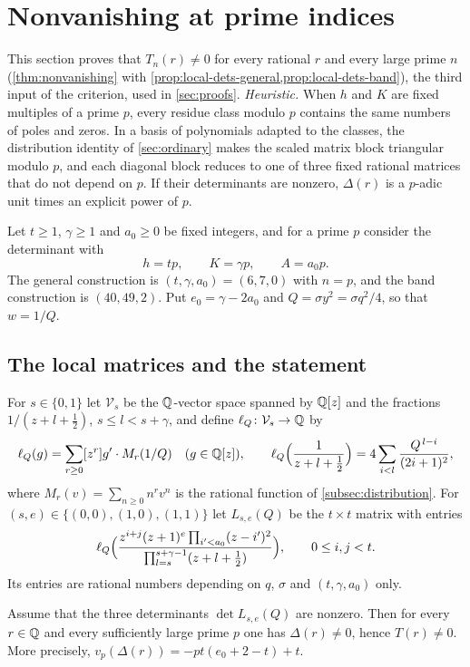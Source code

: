 \section{Nonvanishing at prime indices}\label{sec:nonvanishing}

This section proves that $T_n(r)\ne0$ for every rational $r$ and every large prime $n$
(\cref{thm:nonvanishing} with \cref{prop:local-dets-general,prop:local-dets-band}), the third input
of the criterion, used in \cref{sec:proofs}. \emph{Heuristic.} When $h$ and $K$ are fixed multiples
of a prime $p$, every residue class modulo $p$ contains the same numbers of poles and zeros. In a
basis of polynomials adapted to the classes, the distribution identity of \cref{sec:ordinary}
makes the scaled matrix block triangular modulo $p$, and each diagonal block reduces to one of
three fixed rational matrices that do not depend on $p$. If their determinants are nonzero,
$\Delta(r)$ is a $p$-adic unit times an explicit power of $p$.

Let $t\ge1$, $\gamma\ge1$ and $a_0\ge0$ be fixed integers, and for a prime $p$ consider the
determinant with
\[
  h=tp,\qquad K=\gamma p,\qquad A=a_0p .
\]
The general construction is $(t,\gamma,a_0)=(6,7,0)$ with $n=p$, and the band construction is
$(40,49,2)$. Put $e_0=\gamma-2a_0$ and $Q=\sigma y^2=\sigma q^2/4$, so that $w=1/Q$.

\subsection{The local matrices and the statement}\label{subsec:local-matrices}

For $s\in\{0,1\}$ let $\mathcal V_s$ be the $\mathbb{Q}$-vector space spanned by $\mathbb{Q}[z]$ and the
fractions $1/(z+l+\frac12)$, $s\le l<s+\gamma$, and define $\ell_Q\colon\mathcal V_s\to\mathbb{Q}$ by
\begin{equation}\label{eq:ellQ}
  \ell_Q(g)=\sum_{r\ge0}[z^r]g'\cdot M_r(1/Q)\quad(g\in\mathbb{Q}[z]),\qquad
  \ell_Q\Bigl(\frac1{z+l+\frac12}\Bigr)=4\sum_{i<l}\frac{Q^{\,l-i}}{(2i+1)^2},
\end{equation}
where $M_r(v)=\sum_{n\ge0}n^rv^n$ is the rational function of \cref{subsec:distribution}. For
$(s,e)\in\{(0,0),(1,0),(1,1)\}$ let $L_{s,e}(Q)$ be the $t\times t$ matrix with entries
\[
  \ell_Q\Bigl(\frac{z^{i+j}(z+1)^e\prod_{i'<a_0}(z-i')^2}{\prod_{l=s}^{s+\gamma-1}(z+l+\frac12)}
  \Bigr),\qquad 0\le i,j<t .
\]
Its entries are rational numbers depending on $q$, $\sigma$ and $(t,\gamma,a_0)$ only.

\begin{theorem}\label{thm:nonvanishing}
Assume that the three determinants $\det L_{s,e}(Q)$ are nonzero. Then for every $r\in\mathbb{Q}$ and
every sufficiently large prime $p$ one has $\Delta(r)\ne0$, hence $T(r)\ne0$. More precisely,
$v_p(\Delta(r))=-pt(e_0+2-t)+t$.
\end{theorem}

